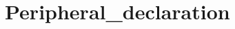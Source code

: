 \hypertarget{group___peripheral__declaration}{\section{Peripheral\-\_\-declaration}
\label{group___peripheral__declaration}
}
